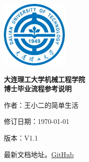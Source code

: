 \documentclass[12pt,a4paper]{ctexart}
\begin{document}
\begin{titlepage}

  \centering

        \includegraphics[width=0.25\textwidth]{images/logo.png}  %


      
    \vspace{2cm}  %
    \centering
    \Huge \bfseries 大连理工大学机械工程学院\\
    \vspace{0.5cm}
    \Huge \bfseries 博士毕业流程参考说明\\
    \vspace{4cm}  %
    

        \normalsize 作者：王小二的简单生活\\
        \vspace{0.3cm}
        
        修订日期：\today\\
        \vspace{0.3cm}
        
        版本：V1.1
        \vspace{0.3cm}
        
        最新文档地址。\href{https://github.com/DrHanks91/DUTMePhDProcess.git}{GitHub}

    
    \vfill
\end{titlepage}

\clearpage  %

\pagestyle{fancy}

\fancyhf{}


\fancyfoot[C]{\thepage}
\fancyfoot[C]{\thepage}
\renewcommand{\headrulewidth}{1.5pt}  %
\tableofcontents
\end{document}
